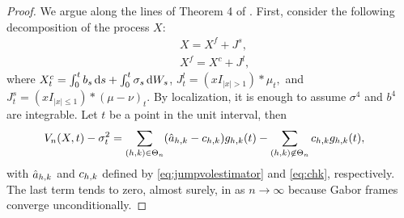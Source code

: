 \begin{proof}
  \begin{comment}  We wish to show that the random variable
  $\int_0^1 (\jvn - \sigma^2(t))^2\D t$ tends to zero in probability. The regularity conditions on $X$ and $\sigma^2$ imply that  $\sup_{t \in [0,1]} (\jvn - \sigma^2(t))^2$ is a random variable and that the previous claim would follow as soon as $\sup_{t \in [0,1]} (\jvn - \sigma^2(t))^2$ is shown  to converge to  zero in probability.\end{comment}
  We argue along the lines of Theorem 4 of  \cite{Mancini2009}. First,  consider the following decomposition of the process $X$:
  \begin{align}
    &X = X^f + J^s\label{eq:xj},\\
    &X^f = X^c + J^l\label{eq:xjc},
  \end{align}
  where 
    $X^c_t = \int^t_0 b_s \D s + \int^t_0 \sigma_s \D W_s$, 
    $J^l_t = (xI_{\vert x \vert > 1}) \ast \mu_t,$
    and $J^s_t = (xI_{\vert x \vert \le  1} )\ast (\mu - \nu)_t$. By localization, it is enough to assume $\sigma^4$ and  $b^4$   are integrable. 
    Let $t$ be a point in the unit interval, then 
    \begin{align}
      \jvn -  \sigma^2_t &= \sumt (\ceen{X} - \cee) \ghk(t) - \sumnt \cee \ghk(t),
      \label{eq:open}
    \end{align}
    with $\ceen{X}$ and $\cee$ defined by \eqref{eq:jumpvolestimator} and \eqref{eq:chk}, respectively. The last term tends to zero, almost surely, in \Ltwo as $n \to \infty$ because Gabor frames converge unconditionally. 
    

\end{proof}
